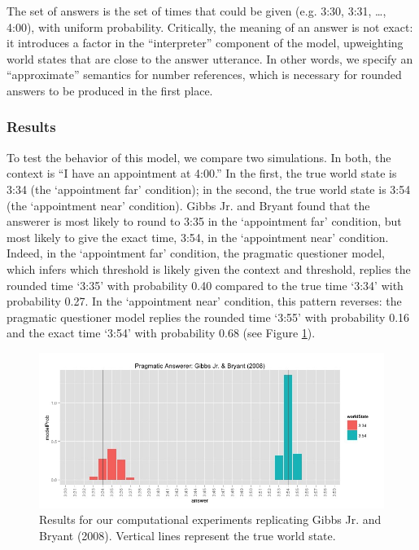\documentclass[12pt, floatsintext, man]{apa6}
\begin{document}
 The set of answers is the set of times that could be given (e.g. 3:30, 3:31, \dots, 4:00), with uniform probability. Critically, the meaning of an answer is not exact: it introduces a factor in the ``interpreter'' component of the model, upweighting world states that are close to the answer utterance. In other words, we specify an ``approximate'' semantics for number references, which is necessary for rounded answers to be produced in the first place.
 
 \subsubsection{Results}
 
 To test the behavior of this model, we compare two simulations. In both, the context is ``I have an appointment at 4:00.'' In the first, the true world state is 3:34 (the `appointment far' condition); in the second, the true world state is 3:54 (the `appointment near' condition). Gibbs Jr. and Bryant \citeyear{GibbsBryant08_OptimalRelevance} found that the answerer is most likely to round to 3:35 in the `appointment far' condition, but most likely to give the exact time, 3:54, in the `appointment near' condition. Indeed, in the `appointment far' condition, the pragmatic questioner model, which infers which threshold is likely given the context and threshold, replies the rounded time `3:35' with probability 0.40 compared to the true time `3:34' with probability 0.27. In the `appointment near' condition, this pattern reverses: the pragmatic questioner model replies the rounded time `3:55' with probability 0.16 and the exact time `3:54' with probability 0.68 (see Figure \ref{fig:timeExperimentResults}).
 
 \begin{figure}
\begin{center}
\includegraphics[scale = .5]{timeExpResults.jpeg}
\end{center}
\vspace{-.25cm}
\caption{Results for our computational experiments replicating Gibbs Jr. and Bryant (2008). Vertical lines represent the true world state.}
\label{fig:timeExperimentResults}
\end{figure}
\end{document}
